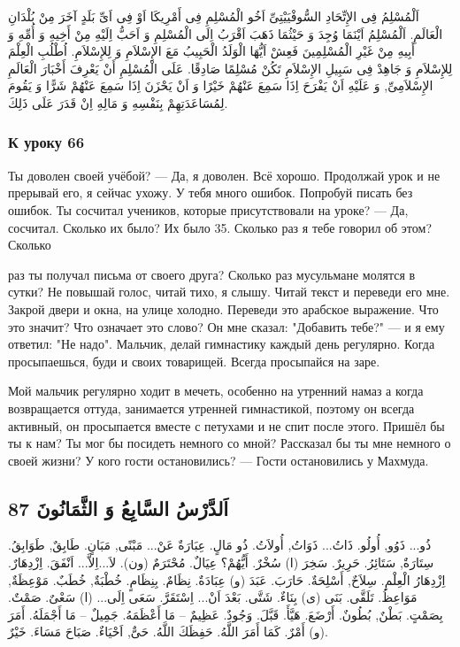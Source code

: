 \documentclass[a5paper]{article}
\begin{document}
اَلْمُسْلِمُ فِى الإِتِّحَادِ السُّوفْيَيْتِىِّ اَخُو الْمُسْلِمِ فِى أَمْرِيكَا اَوْ فِى اَىِّ بَلَدٍ آخَرَ مِنْ بُلْدَانِ الْعَالَمِ. اَلْمُسْلِمُ اَيْنَمَا وُجِدَ وَ حَيْثُمَا ذَهَبَ اَقْرَبُ اِلَى الْمُسْلِمِ وَ اَحَبُّ اِلَيْهِ مِنْ أَخِيهِ وَ أُمِّهِ وَ أَبِيهِ مِنْ غَيْرِ الْمُسْلِمِينَ فَعِشْ اَيُّهَا الْوَلَدُ الْحَبِيبُ مَعَ الإِسْلاَمِ وَ لِلإِسْلاَمِ. اُطْلُبِ الْعِلْمَ لِلإِسْلاَمِ وَ جَاهِدْ فِى سَبِيلِ الإِسْلاَمِ تَكُنْ مُسْلِمًا صَادِقًا. عَلَى الْمُسْلِمِ أَنْ يَعْرِفَ أَخْبَارَ الْعَالَمِ الإِسْلاَمِىِّ, وَ عَلَيْهِ اَنْ يَفْرَحَ اِذَا سَمِعَ عَنْهُمْ خَيْرًا وَ اَنْ يَحْزَنَ اِذَا سَمِعَ عَنْهُمْ شَرًّا وَ يَقُومَ لِمُسَاعَدَتِهِمْ بِنَفْسِهِ وَ مَالِهِ اِنْ قَدَرَ عَلَى ذَلِكَ. 

\subsubsection{К уроку 66}
Ты доволен своей учёбой? — Да, я доволен. Всё хорошо. Продолжай урок и не прерывай его, я сейчас ухожу. У тебя много ошибок. Попробуй писать без ошибок. Ты сосчитал учеников, которые присутствовали на уроке? — Да, сосчитал. Сколько их было? Их было 35. Сколько раз я тебе говорил об этом? Сколько

раз ты получал письма от своего друга? Сколько раз мусульмане молятся в сутки? Не повышай голос, читай тихо, я слышу. Читай текст и переведи его мне. Закрой двери и окна, на улице холодно. Переведи это арабское выражение. Что это значит? Что означает это слово? Он мне сказал: "Добавить тебе?" — и я ему ответил: "Не надо". Мальчик, делай гимнастику каждый день регулярно. Когда просыпаешься, буди и своих товарищей. Всегда просыпайся на заре.

Мой мальчик регулярно ходит в мечеть, особенно на утренний намаз а когда возвращается оттуда, занимается утренней гимнастикой, поэтому он всегда активный, он просыпается вместе с петухами и не спит после этого. Пришёл бы ты к нам? Ты мог бы посидеть немного со мной? Рассказал бы ты мне немного о своей жизни? У кого гости остановились? — Гости остановились у Махмуда.

\subsection{اَلدَّرْسُ السَّابِعُ وَ الثَّمَانُونَ 87}
ذُو... ذَوُو, أُولُو. ذَاتُ... ذَوَاتُ, أُولاَتُ. ذُو مَالٍ. عِبَارَةٌ عَنْ... مَبْنًى, مَبَانٍ. طَابِقٌ, طَوَابِقُ. سِتَارَةٌ, سَتَائِرُ. حَرِيرٌ. سَخِرَ (ا) سُخْرٌ. أَيُّهُمْ؟ عِيَالٌ. مُحْتَرَمٌ (ون). لاَ...اِلاَّ... اَنْفَقَ. اِزْدِهَارٌ. اِزْدِهَارُ الْعِلْمِ. سِلاَحٌ, أَسْلِحَةٌ. حَارَبَ. عَبَدَ (و) عِبَادَةٌ. نِظَامٌ. بِنِظَامٍ. خُطْبَةٌ, خُطَبٌ. مَوْعِظَةٌ, مَوَاعِظُ. تَلَقَّى. بَنَى (ى) بِنَاءٌ. شَتَّى. بَعْدَ اَنْ... اِسْتَقَرَّ. سَعَى اِلَى... (ا) سَعْىٌ. صَمْتٌ. بِصَمْتٍ. بَطْنٌ, بُطُونٌ. أَرْضَعَ. هَيَّأَ. قَبَّلَ. وَجُودٌ. عَظِيمٌ – مَا أَعْظَمَهُ. جَمِيلٌ – مَا أَجْمَلَهُ. أَمَرَ (و) أَمْرٌ. كَمَا أَمَرَ اللَّهُ. حَفِظَكَ اللَّهُ. حَىٌّ, اَحْيَاءٌ. صَبَاحَ مَسَاءَ. خَيْرٌ.
\end{document}
